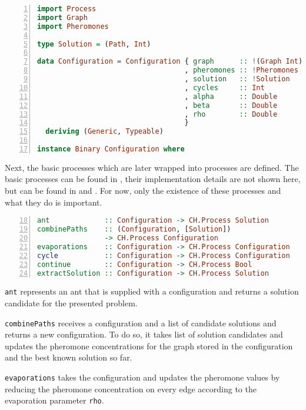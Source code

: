 \begin{lstlisting}[language=Haskell,frame=tb,numbers=left,label=lst:ant_conf,caption=Imports and configuration for the ant system., basicstyle=\footnotesize\ttfamily]
import Process
import Graph
import Pheromones

type Solution = (Path, Int)

data Configuration = Configuration { graph      :: !(Graph Int)
                                   , pheromones :: !Pheromones
                                   , solution   :: !Solution
                                   , cycles     :: Int
                                   , alpha      :: Double
                                   , beta       :: Double
                                   , rho        :: Double
                                   }
  deriving (Generic, Typeable)

instance Binary Configuration where
\end{lstlisting}

Next, the basic processes which are later wrapped into processes are defined. The basic processes can be found in , their implementation details are not shown here, but can be found in  and . For now, only the existence of these processes and what they do is important.

\begin{lstlisting}[language=Haskell,frame=tb,numbers=left,label=lst:ant_basic,caption=Signatures of the basic processes for the ant system.,firstnumber=18]
ant             :: Configuration -> CH.Process Solution
combinePaths    :: (Configuration, [Solution])
                -> CH.Process Configuration
evaporations    :: Configuration -> CH.Process Configuration
cycle           :: Configuration -> CH.Process Configuration
continue        :: Configuration -> CH.Process Bool
extractSolution :: Configuration -> CH.Process Solution
\end{lstlisting}

\texttt{ant} represents an ant that is supplied with a configuration and returns a solution candidate for the presented problem.

\texttt{combinePaths} receives a configuration and a list of candidate solutions and returns a new configuration. To do so, it takes list of solution candidates and updates the pheromone concentrations for the graph stored in the configuration and the best known solution so far.

\texttt{evaporations} takes the configuration and updates the pheromone values by reducing the pheromone concentration on every edge according to the evaporation parameter \texttt{rho}.

